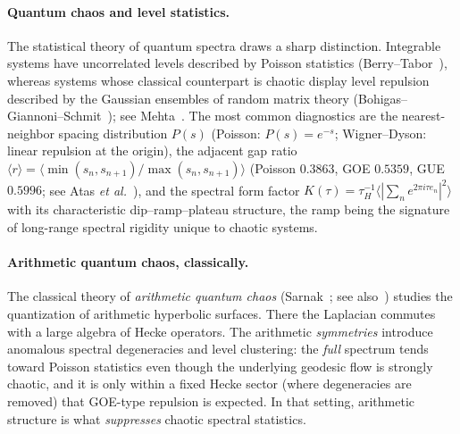 \documentclass[aps,prx,reprint,floatfix]{revtex4-2}
\begin{document}
\paragraph{Quantum chaos and level statistics.}
The statistical theory of quantum spectra draws a sharp distinction.
Integrable systems have uncorrelated levels described by Poisson statistics
(Berry--Tabor~\cite{berry1977}), whereas systems whose classical counterpart is
chaotic display level repulsion described by the Gaussian ensembles of random
matrix theory (Bohigas--Giannoni--Schmit~\cite{bgs1984}); see
Mehta~\cite{mehta}. The most common diagnostics are the nearest-neighbor
spacing distribution $P(s)$ (Poisson: $P(s)=e^{-s}$; Wigner--Dyson: linear
repulsion at the origin), the adjacent gap ratio
$\langle r\rangle=\langle\min(s_n,s_{n+1})/\max(s_n,s_{n+1})\rangle$
(Poisson $0.3863$, GOE $0.5359$, GUE $0.5996$; see Atas \emph{et
al.}~\cite{atas2013}), and the spectral form factor
$K(\tau)=\tau_H^{-1}\langle |\sum_n e^{2\pi i \tau e_n}|^2\rangle$
with its characteristic dip--ramp--plateau structure, the ramp being the
signature of long-range spectral rigidity unique to chaotic systems.

\paragraph{Arithmetic quantum chaos, classically.}
The classical theory of \emph{arithmetic quantum chaos}
(Sarnak~\cite{sarnak1995}; see also~\cite{rudnick1996}) studies the
quantization of arithmetic hyperbolic surfaces. There the Laplacian commutes
with a large algebra of Hecke operators. The arithmetic \emph{symmetries}
introduce anomalous spectral degeneracies and level clustering: the
\emph{full} spectrum tends toward Poisson statistics even though the
underlying geodesic flow is strongly chaotic, and it is only within a fixed
Hecke sector (where degeneracies are removed) that GOE-type repulsion is
expected. In that setting, arithmetic structure is what \emph{suppresses}
chaotic spectral statistics.
\end{document}
